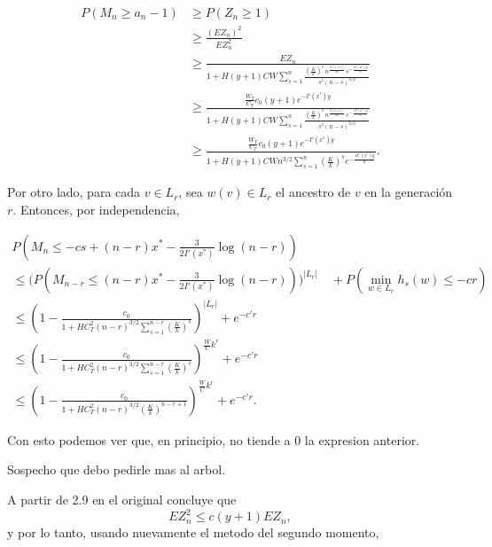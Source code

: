 \documentclass[12pt]{report}
\begin{document}
\[
\begin{aligned}
P(M_n \geq a_n - 1) 
&\geq P(Z_n \geq 1) \\
&\geq \frac{(E Z_n)^2}{E Z_n^2} \\
&\geq \frac{E Z_n}{1 + H (y + 1) C W 
    \sum_{s = 1}^{n} 
    \frac{\left(\tfrac{K}{k}\right)^s \, n^{\tfrac{3(n + s)}{2n}} \, e^{- \tfrac{s I'(x^*) y}{n}}}
         {s^3 (n - s)^{3/2}} } \\
&\geq \frac{\tfrac{W_T}{C_T} c_0 (y+1) e^{-I'(x^*)y}}
{1 + H (y + 1) C W 
    \sum_{s = 1}^{n} 
    \frac{\left(\tfrac{K}{k}\right)^s \, n^{\tfrac{3(n + s)}{2n}} \, e^{- \tfrac{s I'(x^*) y}{n}}}
         {s^3 (n - s)^{3/2}} } \\
&\geq \frac{\tfrac{W_T}{C_T} c_0 (y+1) e^{-I'(x^*)y}}
{1 + H (y + 1) C W n^{3/2}
    \sum_{s = 1}^{n} {
    \left(\tfrac{K}{k}\right)^s} e^{- \tfrac{s I'(x^*) y}{n}}}.
\end{aligned}
\]


Por otro lado, para cada $ v \in L_r $, sea $ w(v) \in L_r $ el ancestro de $v$ en la generación $r$. Entonces, por independencia,

\[
\begin{aligned}
P\!\left(M_n \leq -cs + (n - r)x^* - \tfrac{3}{2I'(x^*)} \log(n - r) \right) \\
\leq \Big( P\!\left(M_{n-r} \leq (n - r)x^* - \tfrac{3}{2I'(x^*)}\log(n - r)\right) \Big)^{|L_r|} 
\quad + P\!\left( \min_{w \in L_r} h_s(w) \leq -cr \right)\\
\leq \left(1 - \frac{c_0}
{1 + H C_T ^2 (n-r)^{3/2}
    \sum_{s = 1}^{n-r} 
    \left(\tfrac{K}{k}\right)^s} 
          \right)^{|L_r|} + e^{-c'r} \\
\leq \left(1 - \frac{c_0}
{1 + H C_T ^2 (n-r)^{3/2}
    \sum_{s = 1}^{n-r} 
    \left(\tfrac{K}{k}\right)^s} 
          \right)^{\frac{W}{C} k^r} + e^{-c'r}\\
\leq \left(1 - \frac{c_0}
{1 + H C_T ^2 (n-r)^{3/2}
    (\frac{K}{k})^{n-r+1}} 
          \right)^{\frac{W}{C} k^r} + e^{-c'r}.
\end{aligned}
\]

Con esto podemos ver que, en principio, no tiende a 0 la expresion anterior.

Sospecho que debo pedirle mas al arbol.

\vspace{5em}
A partir de 2.9 en el original concluye que
\[
E Z_n^2 \leq c(y+1) E Z_n,
\]
y por lo tanto, usando nuevamente el metodo del segundo momento,
\end{document}
